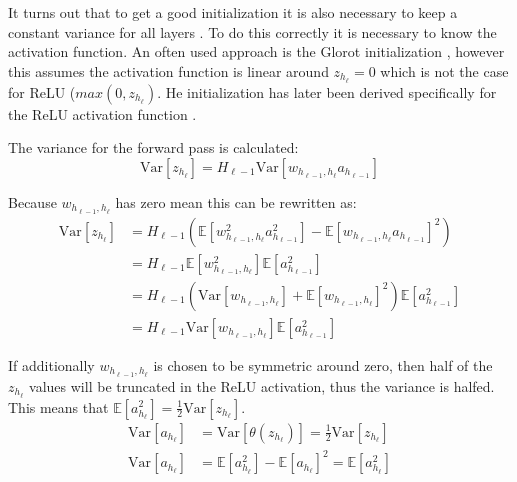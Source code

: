 It turns out that to get a good initialization it is also necessary to keep a constant variance for all layers \cite{glorot-initialization, he-initialization}. To do this correctly it is necessary to know the activation function. An often used approach is the Glorot initialization \cite{glorot-initialization}, however this assumes the activation function is linear around $z_{h_\ell} = 0$ which is not the case for ReLU ($max(0, z_{h_{\ell}})$. He initialization has later been derived specifically for the ReLU activation function \cite{he-initialization}.

The variance for the forward pass is calculated:
\begin{equation}
\mathrm{Var}[z_{h_\ell}] = H_{\ell-1} \mathrm{Var}[w_{h_{\ell-1}, h_{\ell}} a_{h_{\ell-1}}]
\end{equation}

Because $w_{h_{\ell-1}, h_{\ell}}$ has zero mean this can be rewritten as:
\begin{equation}
\begin{aligned}
\mathrm{Var}[z_{h_\ell}]
&= H_{\ell-1} \left( \mathbb{E}[w_{h_{\ell-1}, h_{\ell}}^2 a_{h_{\ell-1}}^2] - \mathbb{E}[w_{h_{\ell-1}, h_{\ell}} a_{h_{\ell-1}}]^2 \right) \\
&= H_{\ell-1} \mathbb{E}[w_{h_{\ell-1}, h_{\ell}}^2] \mathbb{E}[a_{h_{\ell-1}}^2] \\
&= H_{\ell-1} \left(\mathrm{Var}[w_{h_{\ell-1}, h_{\ell}}] + \mathbb{E}[w_{h_{\ell-1}, h_{\ell}}]^2\right) \mathbb{E}[a_{h_{\ell-1}}^2] \\
&= H_{\ell-1} \mathrm{Var}[w_{h_{\ell-1}, h_{\ell}}] \mathbb{E}[a_{h_{\ell-1}}^2]
\end{aligned}
\end{equation}

If additionally $w_{h_{\ell-1}, h_{\ell}}$ is chosen to be symmetric around zero, then half of the $z_{h_\ell}$ values will be truncated in the ReLU activation, thus the variance is halfed. This means that $\mathbb{E}[a_{h_\ell}^2] = \frac{1}{2} \mathrm{Var}[z_{h_\ell}]$.
\begin{equation}
\begin{aligned}
\mathrm{Var}[a_{h_\ell}] &= \mathrm{Var}[\theta(z_{h_\ell})] = \frac{1}{2}\mathrm{Var}[z_{h_\ell}] \\
\mathrm{Var}[a_{h_\ell}] &= \mathbb{E}[a_{h_\ell}^2] -\mathbb{E}[a_{h_\ell}]^2 = \mathbb{E}[a_{h_\ell}^2]
\end{aligned}
\end{equation}

